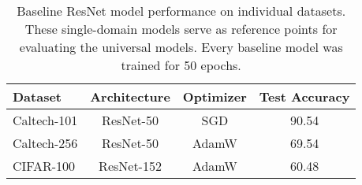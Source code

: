 \begin{table}[ht]
\centering
\caption{Baseline ResNet model performance on individual datasets. These single-domain models serve as reference points for evaluating the universal models. Every baseline model was trained for 50 epochs.}
\label{tab:baseline_model_results}
\begin{tabular}{lccc}
\toprule
Dataset & Architecture & Optimizer & Test Accuracy \\
\midrule
Caltech-101 & ResNet-50 & SGD & 90.54 \\
Caltech-256 & ResNet-50 & AdamW & 69.54 \\
CIFAR-100 & ResNet-152 & AdamW & 60.48 \\
\bottomrule
\end{tabular}
\end{table}
